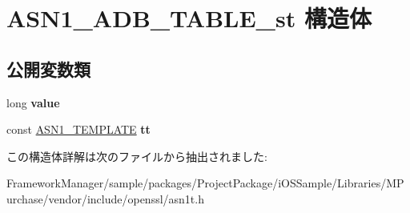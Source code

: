 \hypertarget{struct_a_s_n1___a_d_b___t_a_b_l_e__st}{}\section{A\+S\+N1\+\_\+\+A\+D\+B\+\_\+\+T\+A\+B\+L\+E\+\_\+st 構造体}
\label{struct_a_s_n1___a_d_b___t_a_b_l_e__st}
\subsection*{公開変数類}
\begin{DoxyCompactItemize}
\item 
\hypertarget{struct_a_s_n1___a_d_b___t_a_b_l_e__st_a629d5818b02f9fb52b74bad469e1e5b0}{}long {\bfseries value}\label{struct_a_s_n1___a_d_b___t_a_b_l_e__st_a629d5818b02f9fb52b74bad469e1e5b0}

\item 
\hypertarget{struct_a_s_n1___a_d_b___t_a_b_l_e__st_ae2a3f9d776e8c11c09d8b9879c63fac2}{}const \hyperlink{struct_a_s_n1___t_e_m_p_l_a_t_e__st}{A\+S\+N1\+\_\+\+T\+E\+M\+P\+L\+A\+T\+E} {\bfseries tt}\label{struct_a_s_n1___a_d_b___t_a_b_l_e__st_ae2a3f9d776e8c11c09d8b9879c63fac2}

\end{DoxyCompactItemize}


この構造体詳解は次のファイルから抽出されました\+:\begin{DoxyCompactItemize}
\item 
Framework\+Manager/sample/packages/\+Project\+Package/i\+O\+S\+Sample/\+Libraries/\+M\+Purchase/vendor/include/openssl/asn1t.\+h\end{DoxyCompactItemize}
